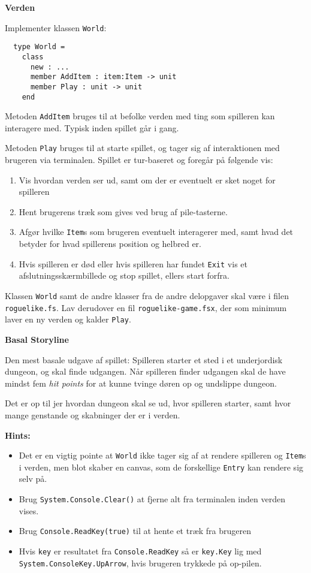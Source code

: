 \textbf{Verden}

Implementer klassen \lstinline{World}:

\begin{lstlisting}
  type World =
    class
      new : ...
      member AddItem : item:Item -> unit
      member Play : unit -> unit
    end
\end{lstlisting}

Metoden \lstinline{AddItem} bruges til at befolke verden med ting som spilleren
kan interagere med. Typisk inden spillet går i gang.

Metoden \lstinline{Play} bruges til at starte spillet, og tager sig af
interaktionen med brugeren via terminalen. Spillet er tur-baseret og
foregår på følgende vis:
\begin{enumerate}
\item Vis hvordan verden ser ud, samt om der er eventuelt er sket
  noget for spilleren
\item Hent brugerens træk som gives ved brug af pile-tasterne.
\item Afgør hvilke \lstinline{Item}s som brugeren eventuelt interagerer med,
  samt hvad det betyder for hvad spillerens position og helbred er.
\item Hvis spilleren er død eller hvis spilleren har fundet
  \lstinline{Exit} vis et afslutningsskærmbillede og stop
  spillet, ellers start forfra.
\end{enumerate}

Klassen \lstinline{World} samt de andre klasser fra de andre
delopgaver skal være i filen \texttt{roguelike.fs}. Lav derudover en
fil \texttt{roguelike-game.fsx}, der som minimum laver en ny verden og
kalder \lstinline{Play}.


\textbf{Basal Storyline}

Den mest basale udgave af spillet: Spilleren starter et sted i et
underjordisk dungeon, og skal finde udgangen. Når spilleren finder
udgangen skal de have mindst fem \emph{hit points} for at kunne tvinge
døren op og undslippe dungeon.

Det er op til jer hvordan dungeon skal se ud, hvor spilleren starter,
samt hvor mange genstande og skabninger der er i verden.


\textbf{Hints:}
\begin{itemize}
\item Det er en vigtig pointe at \lstinline{World} ikke tager sig af
  at rendere spilleren og \lstinline{Item}s i verden, men blot skaber
  en canvas, som de forskellige \lstinline{Entry} kan rendere sig selv
  på.
\item Brug \lstinline{System.Console.Clear()} at fjerne alt fra terminalen inden
  verden vises.
\item Brug \lstinline{Console.ReadKey(true)} til at hente et træk fra brugeren
\item Hvis \lstinline{key} er resultatet fra \lstinline{Console.ReadKey} så er \lstinline{key.Key}
  lig med\\ \lstinline{System.ConsoleKey.UpArrow}, hvis brugeren trykkede på
  op-pilen.
\end{itemize}





